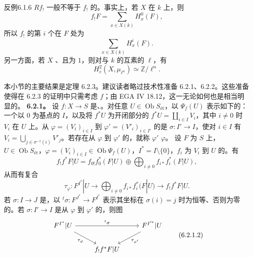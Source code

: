 \begin{SGAresult}{反例}{6.1.6}
 $Rf_!$ 一般不等于 $f_!$ 的。事实上，若 $X$ 在 $k$ 上，则
\[f_!F=\sum_{x\in X(k)}H_x^0(F),\]
所以 $f_!$ 的第 $i$ 个在 $F$ 处为
\[\sum_{x\in X(k)}H_x^i(F).\]
另一方面，若 $X$ 、且为 $1$，则对与 $k$ 的互素的 $\ell$，有
\[H_c^2(X,\mu_{\ell^n})\simeq\mathbb Z/\ell^n.\]
\end{SGAresult}
本小节的主要结果是定理 6.2.3。建议读者略过技术性准备 6.2.1、6.2.2。这些准备使得在 6.2.3 的证明中只需考虑 $f$；由 EGA IV 18.12，这一无论如何也是相当明显的。
\textbf{6.2.1。} 设 $f:X\to S$ 是、。对任意 $U\in\operatorname{Ob}S_{\text{ét}}$，以 $\Psi_f(U)$ 表示如下的：一个以 $0$ 为基点的 $I$，以及将 $f^*U$ 为开闭部分的 $f^*U=\coprod_{i\in I}V_i$，其中 $i\ne0$ 时 $V_i$ 在 $U$ 上。从 $\varphi=(V_i)_{i\in I}$ 到 $\varphi'=(V'_i)_{i\in I'}$ 的是 $\sigma:I'\to I$，使对 $i\in I$ 有 $V_i=\bigcup_{j\in\sigma^{-1}(i)}V'_j$。若存在从 $\varphi$ 到 $\varphi'$ 的，就称 $\varphi'$  $\varphi$。
设 $F$ 为 $S$ 上，$U\in\operatorname{Ob}S_{\text{ét}}$，$\varphi=(V_i)_{i\in I}\in\operatorname{Ob}\Psi_f(U)$，$I^*=I\setminus\{0\}$，$f_i$ 为 $V_i$ 到 $U$ 的。有
\[f_!f^*F|U=f_{0!}f_0^*(F|U)\oplus\bigoplus_{i\ne0}f_{i*}f_i^*(F|U),\]
从而有复合
\[\tau_\varphi:F^{I^*}|U\longrightarrow\bigoplus_{i\ne0}f_{i*}f_i^*(F|U)\longrightarrow f_!f^*F|U.\tag{6.2.1.1}\]
若 $\sigma:I\to J$ 是，以 ${}^t\sigma:F^{J^*}\to F^{I^*}$ 表示其坐标在 $\sigma(i)=j$ 时为恒等、否则为零的。若 $\sigma:I'\to I$ 是从 $\varphi$ 到 $\varphi'$ 的，则图
\[\begin{tikzcd}F^{I^*}|U\arrow[rr,"{}^t\sigma"]\arrow[dr,"\tau_\varphi"']&&F^{I'^*}|U\arrow[dl,"\tau_{\varphi'}"]\\&f_!f^*F|U&\end{tikzcd}\tag{6.2.1.2}\]
